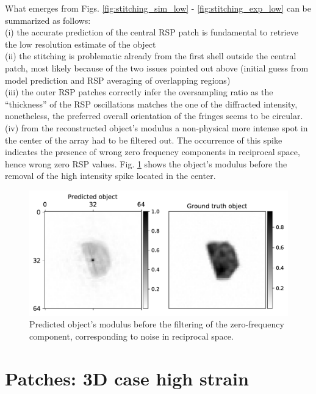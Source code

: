 What emerges from Figs. \ref{fig:stitching_sim_low} - \ref{fig:stitching_exp_low} can be summarized as follows: \\
(i) the accurate prediction of the central RSP patch is fundamental to retrieve the low resolution estimate of the object \\
(ii) the stitching is problematic already from the first shell outside the central patch, most likely because of the 
two issues pointed out above (initial guess from model prediction and RSP averaging of overlapping regions)\\
(iii) the outer RSP patches correctly infer the oversampling ratio as the ``thickness'' of the RSP oscillations matches 
the one of the diffracted intensity, nonetheless, the preferred overall orientation of the fringes seems to be circular.  \\
(iv) from the reconstructed object's modulus a non-physical more intense spot in the center of the array had to be
filtered out. The occurrence of this spike indicates the presence of wrong zero frequency components in reciprocal
space, hence wrong zero RSP values. Fig. \ref{fig:stitching_filtering} shows the object's modulus before the removal of 
the high intensity spike located in the center. 

\begin{figure}[H]
    \centering
    \includegraphics[width=\textwidth]{figures/Phasing/stitching_filtering.pdf}
    \caption{Predicted object's modulus before the filtering of the zero-frequency component, corresponding to noise 
    in reciprocal space. }
    \label{fig:stitching_filtering}
\end{figure}


\section{Patches: 3D case high strain}\label{chp:patches_strain}

